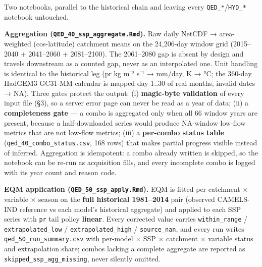 \documentclass[
  english,
  11pt,
]{article}
\begin{document}
Two notebooks, parallel to the historical chain and leaving every
\texttt{QED\_*}/\texttt{HYD\_*} notebook untouched.

\textbf{Aggregation (\texttt{QED\_40\_ssp\_aggregate.Rmd}).} Raw daily
NetCDF → area-weighted (cos-latitude) catchment means on the 24,206-day
window grid (2015--2040 + 2041--2060 + 2081--2100). The 2061--2080 gap
is absent by design and travels downstream as a counted gap, never as an
interpolated one. Unit handling is identical to the historical leg (pr
kg m⁻² s⁻¹ → mm/day, K → °C; the 360-day HadGEM3-GC31-MM calendar is
mapped day 1..30 of real months, invalid dates → NA). Three gates
protect the output: (i) \textbf{magic-byte validation} of every input
file (§3), so a server error page can never be read as a year of data;
(ii) a \textbf{completeness gate} --- a combo is aggregated only when
all 66 window years are present, because a half-downloaded series would
produce NA-window low-flow metrics that are not low-flow metrics; (iii)
a \textbf{per-combo status table} (\texttt{qed\_40\_combo\_status.csv},
168 rows) that makes partial progress visible instead of inferred.
Aggregation is idempotent: a combo already written is skipped, so the
notebook can be re-run as acquisition fills, and every incomplete combo
is logged with its year count and reason code.

\textbf{EQM application (\texttt{QED\_50\_ssp\_apply.Rmd}).} EQM is
fitted per catchment × variable × season on the \textbf{full historical
1981--2014} pair (observed CAMELS-IND reference vs each model's
historical aggregate) and applied to each SSP series with \texttt{pr}
tail policy \textbf{linear}. Every corrected value carries
\texttt{within\_range} / \texttt{extrapolated\_low} /
\texttt{extrapolated\_high} / \texttt{source\_nan}, and every run writes
\texttt{qed\_50\_run\_summary.csv} with per-model × SSP × catchment ×
variable status and extrapolation share; combos lacking a complete
aggregate are reported as \texttt{skipped\_ssp\_agg\_missing}, never
silently omitted.
\end{document}
